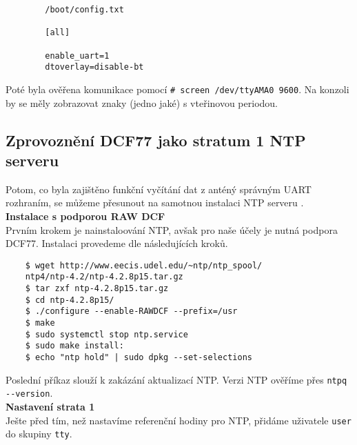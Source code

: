     \vspace{1em}

    \begin{lstlisting}
        /boot/config.txt

        [all]

        enable_uart=1
        dtoverlay=disable-bt
    \end{lstlisting}

    \vspace{1em}

   Poté byla ověřena komunikace pomocí \verb|# screen /dev/ttyAMA0 9600|. Na konzoli by
   se měly zobrazovat znaky (jedno jaké) s vteřinovou periodou.

\newpage

\subsection{Zprovoznění DCF77 jako stratum 1 NTP serveru}
    Potom, co byla zajištěno funkční vyčítání dat z anténý správným UART rozhraním, se
    můžeme přesunout na samotnou instalaci NTP serveru \cite{ntporg}.
    \\

    \textbf{Instalace s podporou RAW DCF}
    \\

    Prvním krokem je nainstaloování NTP, avšak pro naše účely je nutná podpora DCF77.
    Instalaci provedeme dle následujících kroků.

    \vspace{1em}

    \begin{lstlisting}
    $ wget http://www.eecis.udel.edu/~ntp/ntp_spool/
    ntp4/ntp-4.2/ntp-4.2.8p15.tar.gz
    $ tar zxf ntp-4.2.8p15.tar.gz
    $ cd ntp-4.2.8p15/
    $ ./configure --enable-RAWDCF --prefix=/usr
    $ make
    $ sudo systemctl stop ntp.service
    $ sudo make install:
    $ echo "ntp hold" | sudo dpkg --set-selections
    \end{lstlisting}

    \vspace{1em}

    Poslední příkaz slouží k zakázání aktualizací NTP. Verzi NTP ověříme přes
    \verb|ntpq --version|.
    \\

    \textbf{Nastavení strata 1}
    \\

    Ješte před tím, než nastavíme referenční hodiny pro NTP, přidáme uživatele \verb|user| do skupiny
    \verb|tty|.

